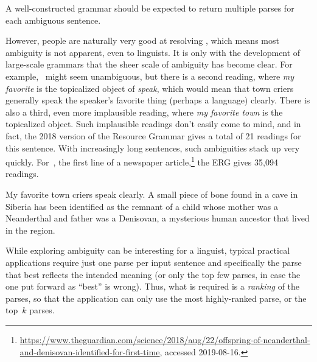 \documentclass[output=paper
 	        ,biblatex
                ,babelshorthands
                ,newtxmath
                ,draftmode
                ,colorlinks, citecolor=brown
]{langscibook}
\begin{document}
\noindent
A well-constructed grammar should be expected to return multiple
parses for each ambiguous sentence.

\largerpage
However, people are naturally very good at resolving ,
which means most ambiguity is not apparent, even to linguists.
It is only with the development of large-scale grammars that the sheer scale of ambiguity has become clear.
For example, ~might seem unambiguous,
but there is a second reading, where \textit{my favorite} is the topicalized object of \textit{speak},
which would mean that town criers generally speak the speaker's favorite thing (perhaps a language) clearly.
There is also a third, even more implausible reading, where \textit{my favorite town} is the topicalized object.
Such implausible readings don't easily come to mind,
and in fact, the 2018 version of the  Resource Grammar \citep[ERG;][]{Flickinger2000a,Flickinger2011a-u}
gives a total of 21 readings for this sentence.
With increasingly long sentences, such ambiguities stack up very quickly.
For~, the first line of a newspaper article,\footnote{%
	\url{https://www.theguardian.com/science/2018/aug/22/offspring-of-neanderthal-and-denisovan-identified-for-first-time}, accessed 2019-08-16.}
the ERG gives 35,094 readings.

\begin{exe}
\ex\label{cl:ex:ambig-simple}
My favorite town criers speak clearly.
\ex\label{cl:ex:ambig-many}
A small piece of bone found in a cave in Siberia has been identified
as the remnant of a child whose mother was a Neanderthal and father was a Denisovan,
a mysterious human ancestor that lived in the region.
\end{exe}

While exploring ambiguity can be interesting for a linguist,
typical practical applications require just one parse per input sentence
and specifically the parse that best reflects the intended meaning
(or only the top few parses, in case the one put forward as ``best'' is wrong).
Thus, what is required is a \textit{ranking} of the parses,
so that the application can only use the most highly-ranked parse,
or the top~$k$ parses.
\end{document}
